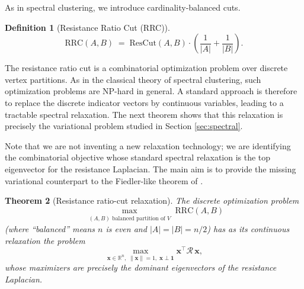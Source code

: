 \documentclass[12pt,a4paper]{amsart}
\newtheorem{theorem}{Theorem}[section]
\theoremstyle{remark}
\theoremstyle{definition}
\newtheorem{definition}[theorem]{Definition}
\newcommand{\R}{\mathbb{R}}
\newcommand{\1}{\mathbf{1}}
\newcommand{\0}{\mathbf{0}}
\newcommand{\bx}{\mathbf{x}}
\newcommand{\calR}{\mathcal{R}}
\newcommand{\norm}[1]{\left\|#1\right\|}
\begin{document}
As in spectral clustering, we introduce cardinality-balanced cuts. 
    
	\begin{definition}[Resistance Ratio Cut (RRC)]
		\[
		\mathrm{RRC}(A, B)
		\;=\; \mathrm{ResCut}(A,B)\cdot\left(\frac{1}{|A|} + \frac{1}{|B|}\right).
		\]
	\end{definition}


The resistance ratio cut is a combinatorial optimization problem over discrete vertex partitions. 
As in the classical theory of spectral clustering, such optimization problems are NP-hard in general. 
A standard approach is therefore to replace the discrete indicator vectors by continuous variables, leading to a tractable spectral relaxation. 
The next theorem shows that this relaxation is precisely the variational problem studied in Section \ref{sec:spectral}.    

Note that we are not inventing a new relaxation technology; we are identifying the combinatorial objective whose standard spectral relaxation is the top eigenvector for the resistance Laplacian. 
The main aim is to provide the missing variational counterpart to the Fiedler-like theorem of \cite{gupta}.

\begin{theorem}[Resistance ratio-cut relaxation]
		\label{thm:rrc}
		The discrete optimization problem
		\[
		\max_{\substack{(A,B)\text{ balanced partition of }V}} \mathrm{RRC}(A,B)
		\]
		(where ``balanced'' means $n$ is even and $|A| = |B| = n/2$)
		has as its continuous relaxation the problem
		\[
		\max_{\bx \in \R^n,\; \norm{\bx}=1,\; \bx \perp \1} \bx^\top \calR\,\bx,
		\]
whose maximizers are precisely the dominant eigenvectors of the resistance Laplacian.
	\end{theorem}
	
\end{document}
